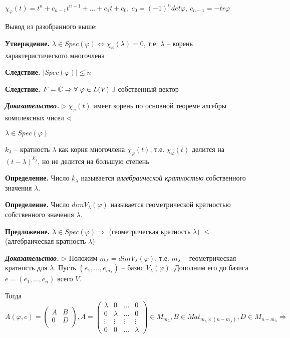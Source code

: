 \vspace{\baselineskip}
$\chi_{\varphi} (t) = t^n + c_{n-1} t^{n-1} + \dots + c_1 t + c_0, \ c_0 = (-1)^n det \varphi, \ c_{n-1} = -tr \varphi$

\vspace{\baselineskip}
Вывод из разобранного выше:

\textbf{Утверждение.} $\lambda \in Spec(\varphi) \Leftrightarrow \chi_{\varphi} (\lambda) = 0$, т.е. $\lambda$ -- корень характеристического многочлена

\vspace{\baselineskip}
\textbf{Следствие.} $|Spec(\varphi)| \leq n$

\vspace{\baselineskip}
\textbf{Следствие.} $F = \mathbb{C} \Rightarrow \forall \ \varphi \in L(V) \ \exists$ собственный вектор

\vspace{\baselineskip}
\textbf{\textit{Доказательство.}} $\rhd \ \chi_{\varphi} (t)$ имеет корень по основной теореме алгебры комплексных чисел $\lhd$

\vspace{\baselineskip}
$\lambda \in Spec(\varphi)$

$k_\lambda$ -- кратность $\lambda$ как корня многочлена $\chi_{\varphi} (t)$, т.е. $\chi_{\varphi} (t)$ делится на $(t - \lambda)^{k_{\lambda}}$, но не делится на большую степень

\vspace{\baselineskip}
\textbf{Определение.} Число $k_{\lambda}$ называется \textit{алгебраической кратностью} собственного значения $\lambda$.

\vspace{\baselineskip}
\textbf{Определение.} Число $dim V_{\lambda} (\varphi)$ называется $\textit{геометрической кратностью}$ собственного значения $\lambda$.

\vspace{\baselineskip}
\textbf{Предложение.} $\lambda \in Spec(\varphi) \Rightarrow$ (геометрическая кратность $\lambda$) $\leq$ (алгебраическая кратность $\lambda$)

\vspace{\baselineskip}
\textbf{\textit{Доказательство.}} $\rhd$ Положим $m_{\lambda} = dim V_{\lambda} (\varphi)$, т.е. $m_{\lambda}$ -- геометрическая кратность для $\lambda$. Пусть $(e_1, \dots, e_{m_\lambda})$ -- базис $V_{\lambda} (\varphi)$. Дополним его до базиса $e = (e_1, \dots, e_n)$ всего $V$.

Тогда $A(\varphi, e) = \left( \begin{array}{c|c}
  A & B  \\
  \hline
  0 & D  \\
\end{array}
\right), A = \begin{pmatrix} \lambda & 0 & \dots & 0 \\ 0 & \lambda & \dots & 0 \\ \vdots & \vdots & \vdots & \vdots \\ 0 & 0 & \dots & \lambda \end{pmatrix} \in M_{m_{\lambda}}, B \in Mat_{m_{\lambda} \times (n - m_{\lambda})}, D \in M_{n - m_{\lambda}} \Rightarrow$

